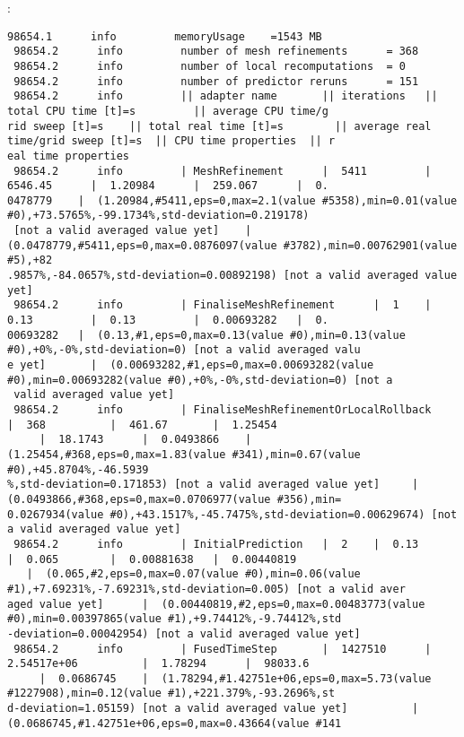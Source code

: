 \amr{}:
\begin{verbatim}
98654.1      info         memoryUsage    =1543 MB
 98654.2      info         number of mesh refinements      = 368
 98654.2      info         number of local recomputations  = 0
 98654.2      info         number of predictor reruns      = 151
 98654.2      info         || adapter name       || iterations   || total CPU time [t]=s         || average CPU time/g
rid sweep [t]=s    || total real time [t]=s        || average real time/grid sweep [t]=s  || CPU time properties  || r
eal time properties 
 98654.2      info         | MeshRefinement      |  5411         |  6546.45      |  1.20984      |  259.067      |  0.
0478779    |  (1.20984,#5411,eps=0,max=2.1(value #5358),min=0.01(value #0),+73.5765%,-99.1734%,std-deviation=0.219178)
 [not a valid averaged value yet]    |  (0.0478779,#5411,eps=0,max=0.0876097(value #3782),min=0.00762901(value #5),+82
.9857%,-84.0657%,std-deviation=0.00892198) [not a valid averaged value yet]
 98654.2      info         | FinaliseMeshRefinement      |  1    |  0.13         |  0.13         |  0.00693282   |  0.
00693282   |  (0.13,#1,eps=0,max=0.13(value #0),min=0.13(value #0),+0%,-0%,std-deviation=0) [not a valid averaged valu
e yet]       |  (0.00693282,#1,eps=0,max=0.00693282(value #0),min=0.00693282(value #0),+0%,-0%,std-deviation=0) [not a
 valid averaged value yet]
 98654.2      info         | FinaliseMeshRefinementOrLocalRollback       |  368          |  461.67       |  1.25454 
     |  18.1743      |  0.0493866    |  (1.25454,#368,eps=0,max=1.83(value #341),min=0.67(value #0),+45.8704%,-46.5939
%,std-deviation=0.171853) [not a valid averaged value yet]     |  (0.0493866,#368,eps=0,max=0.0706977(value #356),min=
0.0267934(value #0),+43.1517%,-45.7475%,std-deviation=0.00629674) [not a valid averaged value yet]
 98654.2      info         | InitialPrediction   |  2    |  0.13         |  0.065        |  0.00881638   |  0.00440819
   |  (0.065,#2,eps=0,max=0.07(value #0),min=0.06(value #1),+7.69231%,-7.69231%,std-deviation=0.005) [not a valid aver
aged value yet]      |  (0.00440819,#2,eps=0,max=0.00483773(value #0),min=0.00397865(value #1),+9.74412%,-9.74412%,std
-deviation=0.00042954) [not a valid averaged value yet]
 98654.2      info         | FusedTimeStep       |  1427510      |  2.54517e+06          |  1.78294      |  98033.6 
     |  0.0686745    |  (1.78294,#1.42751e+06,eps=0,max=5.73(value #1227908),min=0.12(value #1),+221.379%,-93.2696%,st
d-deviation=1.05159) [not a valid averaged value yet]          |  (0.0686745,#1.42751e+06,eps=0,max=0.43664(value #141

\end{verbatim}
